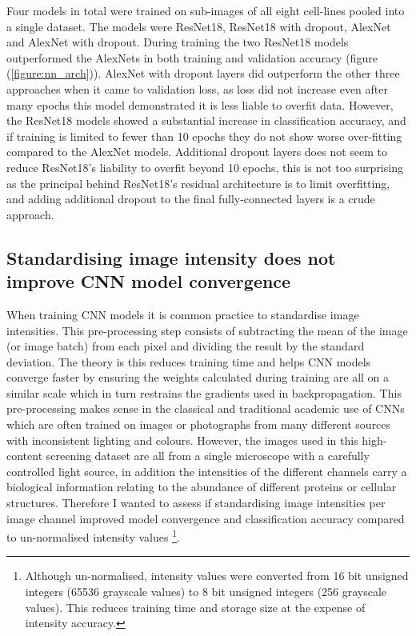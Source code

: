 \documentclass[a4paper,11pt,twoside,openright]{scrbook}
\begin{document}
Four models in total were trained on sub-images of all eight cell-lines pooled into a single dataset.
The models were ResNet18, ResNet18 with dropout, AlexNet and AlexNet with dropout.
During training the two ResNet18 models outperformed the AlexNets in both training and validation accuracy (figure (\ref{figure:nn_arch})).
AlexNet with dropout layers did outperform the other three approaches when it came to validation loss, as loss did not increase even after many epochs this model demonstrated it is less liable to overfit data.
However, the ResNet18 models showed a substantial increase in classification accuracy, and if training is limited to fewer than 10 epochs they do not show worse over-fitting compared to the AlexNet models.
Additional dropout layers does not seem to reduce ResNet18's liability to overfit beyond 10 epochs, this is not too surprising as the principal behind ResNet18's residual architecture is to limit overfitting, and adding additional dropout to the final fully-connected layers is a crude approach.



\subsection{Standardising image intensity does not improve CNN model convergence}

When training CNN models it is common practice to standardise image intensities.
This pre-processing step consists of subtracting the mean of the image (or image batch) from each pixel and dividing the result by the standard deviation.
The theory is this reduces training time and helps CNN models converge faster by ensuring the weights calculated during training are all on a similar scale which in turn restrains the gradients used in backpropagation.
This pre-processing makes sense in the classical and traditional academic use of CNNs which are often trained on images or photographs from many different sources with inconsistent lighting and colours.
However, the images used in this high-content screening dataset are all from a single microscope with a carefully controlled light source, in addition the intensities of the different channels carry a biological information relating to the abundance of different proteins or cellular structures.
Therefore I wanted to assess if standardising image intensities per image channel improved model convergence and classification accuracy compared to un-normalised intensity values
\footnote{Although un-normalised, intensity values were converted from 16 bit unsigned integers (65536 grayscale values) to 8 bit unsigned integers (256 grayscale values).
This reduces training time and storage size at the expense of intensity accuracy.}.
\end{document}
